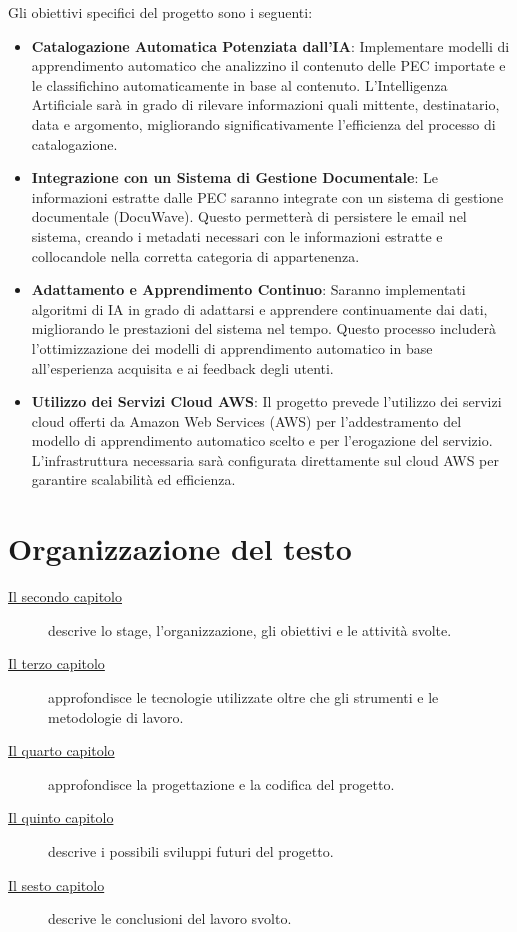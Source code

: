 Gli obiettivi specifici del progetto sono i seguenti:

\begin{itemize}
    \item \textbf{Catalogazione Automatica Potenziata dall'IA}: Implementare modelli di apprendimento automatico che analizzino il contenuto delle PEC importate e le classifichino automaticamente in base al contenuto. L'Intelligenza Artificiale sarà in grado di rilevare informazioni quali mittente, destinatario, data e argomento, migliorando significativamente l'efficienza del processo di catalogazione.
    
    \item \textbf{Integrazione con un Sistema di Gestione Documentale}: Le informazioni estratte dalle PEC saranno integrate con un sistema di gestione documentale (DocuWave). Questo permetterà di persistere le email nel sistema, creando i metadati necessari con le informazioni estratte e collocandole nella corretta categoria di appartenenza.
    
    \item \textbf{Adattamento e Apprendimento Continuo}: Saranno implementati algoritmi di IA in grado di adattarsi e apprendere continuamente dai dati, migliorando le prestazioni del sistema nel tempo. Questo processo includerà l'ottimizzazione dei modelli di apprendimento automatico in base all'esperienza acquisita e ai feedback degli utenti.
    
    \item \textbf{Utilizzo dei Servizi Cloud AWS}: Il progetto prevede l'utilizzo dei servizi cloud offerti da Amazon Web Services (AWS) per l'addestramento del modello di apprendimento automatico scelto e per l'erogazione del servizio. L'infrastruttura necessaria sarà configurata direttamente sul cloud AWS per garantire scalabilità ed efficienza.
\end{itemize}

\section{Organizzazione del testo}

\begin{description}
    \item[{\hyperref[cap:descrizione-stage]{Il secondo capitolo}}] descrive lo stage, l'organizzazione, gli obiettivi e le attività svolte.
    
    \item[{\hyperref[cap:tecnologie]{Il terzo capitolo}}] approfondisce le tecnologie utilizzate oltre che gli strumenti e le metodologie di lavoro.
    
    \item[{\hyperref[cap:progettazione-codifica]{Il quarto capitolo}}] approfondisce la progettazione e la codifica del progetto.
    
    \item[{\hyperref[cap:sviluppi-futuri]{Il quinto capitolo}}] descrive i possibili sviluppi futuri del progetto.
    
    \item[{\hyperref[cap:conclusioni]{Il sesto capitolo}}] descrive le conclusioni del lavoro svolto.
\end{description}